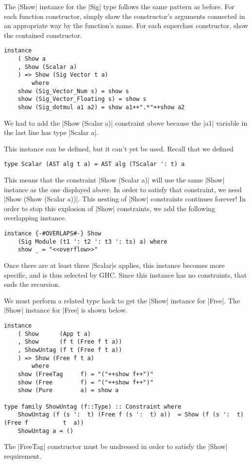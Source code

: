 \documentclass[preprint]{sigplanconf}
\theoremstyle{definition}
\begin{document}
The |Show| instance for the |Sig| type follows the same pattern as before.
For each function constructor,
simply show the constructor's arguments connected in an appropriate way by the function's name.
For each superclass constructor, show the contained constructor.
\begin{lstlisting}
instance
    ( Show a
    , Show (Scalar a)
    ) => Show (Sig Vector t a)
        where
    show (Sig_Vector_Num s) = show s
    show (Sig_Vector_Floating s) = show s
    show (Sig_dotmul a1 a2) = show a1++".*"++show a2
\end{lstlisting}
We had to add the |Show (Scalar a)| constraint above because the |a1| variable in the last line has type |Scalar a|.

This instance can be defined, but it can't yet be used.
Recall that we defined
\begin{lstlisting}
type Scalar (AST alg t a) = AST alg (TScalar ': t) a
\end{lstlisting}
This means that the constraint |Show (Scalar a)| will use the same |Show| instance as the one displayed above.
In order to satisfy that constraint, we need |Show (Show (Scalar a))|.
This nesting of |Show| constraints continues forever!
In order to stop this explosion of |Show| constraints, we add the following overlapping instance.
\begin{lstlisting}
instance {-#OVERLAPS#-} Show
    (Sig Module (t1 ': t2 ': t3 ': ts) a) where
    show _ = "<<overflow>>"
\end{lstlisting}
Once there are at least three |Scalar|s applies,
this instance becomes more specific,
and is thus selected by GHC.
Since this instance has no constraints,
that ends the recursion.

We must perform a related type hack to get the |Show| instance for |Free|.
The |Show| instance for |Free| is shown below.
\begin{lstlisting}
instance
    ( Show      (App t a)
    , Show      (f t (Free f t a))
    , ShowUntag (f t (Free f t a))
    ) => Show (Free f t a)
        where
    show (FreeTag     f) = "("++show f++")"
    show (Free        f) = "("++show f++")"
    show (Pure        a) = show a

type family ShowUntag (f::Type) :: Constraint where
    ShowUntag (f (s ':  t) (Free f (s ':  t) a))  = Show (f (s ':  t) (Free f          t  a))
    ShowUntag a = ()
\end{lstlisting}
The |FreeTag| constructor must be undressed in order to satisfy the |Show| requirement.
\end{document}
